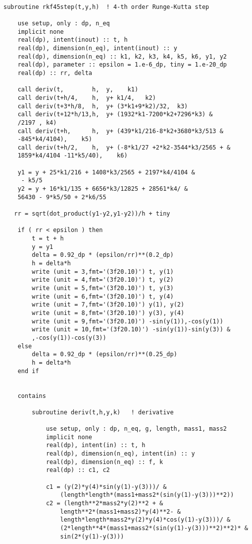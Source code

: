 \documentclass[12pt]{article}
\begin{document}
\begin{lstlisting}[frame=single,caption={ {\tt rkf45.f95}},label=module]

subroutine rkf45step(t,y,h)  ! 4-th order Runge-Kutta step
	
	use setup, only : dp, n_eq
	implicit none
	real(dp), intent(inout) :: t, h
	real(dp), dimension(n_eq), intent(inout) :: y 
	real(dp), dimension(n_eq) :: k1, k2, k3, k4, k5, k6, y1, y2
	real(dp), parameter :: epsilon = 1.e-6_dp, tiny = 1.e-20_dp
	real(dp) :: rr, delta
		
	call deriv(t,	     h,	 y,	   k1)
	call deriv(t+h/4,	 h,  y+ k1/4,   k2)
	call deriv(t+3*h/8,	 h,  y+ (3*k1+9*k2)/32,  k3)
	call deriv(t+12*h/13,h,	 y+ (1932*k1-7200*k2+7296*k3) &
	/2197 , k4)	
	call deriv(t+h,	     h,  y+ (439*k1/216-8*k2+3680*k3/513 &
	-845*k4/4104),	  k5)	
	call deriv(t+h/2,	 h,  y+ (-8*k1/27 +2*k2-3544*k3/2565 + &
	1859*k4/4104 -11*k5/40),	k6)
	
    y1 = y + 25*k1/216 + 1408*k3/2565 + 2197*k4/4104 &
     - k5/5
    y2 = y + 16*k1/135 + 6656*k3/12825 + 28561*k4/ & 
    56430 - 9*k5/50 + 2*k6/55
    
   rr = sqrt(dot_product(y1-y2,y1-y2))/h + tiny
    
    if ( rr < epsilon ) then
        t = t + h
        y = y1
        delta = 0.92_dp * (epsilon/rr)**(0.2_dp)
        h = delta*h
        write (unit = 3,fmt='(3f20.10)') t, y(1)
        write (unit = 4,fmt='(3f20.10)') t, y(2)
        write (unit = 5,fmt='(3f20.10)') t, y(3)
        write (unit = 6,fmt='(3f20.10)') t, y(4)
        write (unit = 7,fmt='(3f20.10)') y(1), y(2)
        write (unit = 8,fmt='(3f20.10)') y(3), y(4)
        write (unit = 9,fmt='(3f20.10)') -sin(y(1)),-cos(y(1))
        write (unit = 10,fmt='(3f20.10)') -sin(y(1))-sin(y(3)) &
        ,-cos(y(1))-cos(y(3))
    else
        delta = 0.92_dp * (epsilon/rr)**(0.25_dp)
        h = delta*h
    end if
	
    	
    contains
    
        subroutine deriv(t,h,y,k)   ! derivative

	        use setup, only : dp, n_eq, g, length, mass1, mass2
	        implicit none
	        real(dp), intent(in) :: t, h
	        real(dp), dimension(n_eq), intent(in) :: y
	        real(dp), dimension(n_eq) :: f, k
	        real(dp) :: c1, c2

	        c1 = (y(2)*y(4)*sin(y(1)-y(3)))/ &
	        	(length*length*(mass1+mass2*(sin(y(1)-y(3)))**2))
	        c2 = (length**2*mass2*y(2)**2 + &
				length**2*(mass1+mass2)*y(4)**2- &
				length*length*mass2*y(2)*y(4)*cos(y(1)-y(3)))/ &
				(2*length**4*(mass1+mass2*(sin(y(1)-y(3)))**2)**2)* &
				sin(2*(y(1)-y(3)))


\end{lstlisting}
\end{document}
